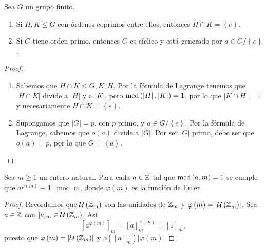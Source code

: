 \begin{colorary}
Sea $\displaystyle G $ un grupo finito. 
\begin{enumerate}
	\item Si $\displaystyle H,K \leq G $ con órdenes coprimos entre ellos, entonces $\displaystyle H \cap K = \left\{ e\right\}  $.
	\item Si $\displaystyle G $ tiene orden primo, entonces $\displaystyle G $ es cíclico y está generado por $\displaystyle a \in G/ \left\{ e\right\}  $.
\end{enumerate}
\end{colorary}
\begin{proof}
\begin{enumerate}
	\item Sabemos que $\displaystyle H \cap K \leq G, K, H $. Por la fórmula de Lagrange tenemos que $\displaystyle \left|H\cap K\right|  $ divide a $\displaystyle \left|H\right| $ y a $\displaystyle \left|K\right| $, pero $\displaystyle \text{mcd}\left( \left|H\right|, \left|K\right|\right) = 1 $, por lo que $\displaystyle \left|K \cap H\right| = 1 $ y necesariamente $\displaystyle H \cap K = \left\{ e\right\}  $. 
	\item Supongamos que $\displaystyle \left|G\right|= p $, con $\displaystyle p $ primo, y $\displaystyle a\in G/ \left\{ e\right\}  $. Por la fórmula de Lagrange, sabemos que $\displaystyle o\left(a\right) $ divide a $\displaystyle \left|G\right| $. Por ser $\displaystyle \left|G\right| $ primo, debe ser que $\displaystyle o\left(a\right) = p $, por lo que $\displaystyle G = \left\langle a \right\rangle  $.
\end{enumerate}
\end{proof}
\begin{theorem}
Sea $\displaystyle m \geq 1 $ un entero natural. Para cada $\displaystyle a \in \mathbb{Z} $ tal que $\displaystyle \text{mcd}\left(a,m\right) = 1 $ se cumple que $\displaystyle a^{\varphi\left(m\right)}\equiv 1 \mod m $, donde $\displaystyle \varphi\left(m\right) $ es la función de Euler.
\end{theorem}
\begin{proof}
	Recordamos que $\displaystyle \mathcal{U}\left(\mathbb{Z}_{m}\right) $ son las unidades de $\displaystyle \mathbb{Z}_{m} $ y $\displaystyle \varphi\left(m\right) = \left|\mathcal{U}\left(\mathbb{Z}_{m}\right)\right| $. Sea $\displaystyle a \in \mathbb{Z}  $ con $\displaystyle [a]_{m} \in \mathcal{U}\left(\mathbb{Z}_{m}\right) $. Así
	\[\left[a^{\varphi\left(m\right)}\right] _{m} = [a]^{\varphi\left(m\right)}_{m} = [1]_{m} ,\]
	puesto que $\displaystyle \varphi\left(m\right) = \left|\mathcal{U}\left(\mathbb{Z}_{m}\right)\right| $ y $\displaystyle o\left([a]_{m}\right) | \varphi\left(m\right) $. 
\end{proof}
